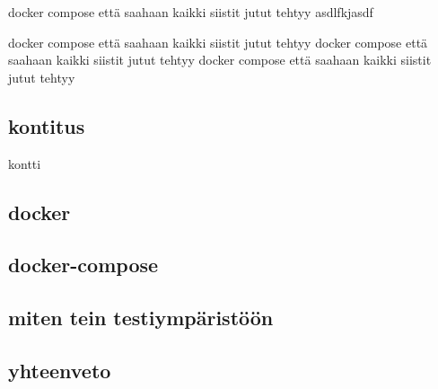 


docker compose että saahaan kaikki siistit jutut tehtyy
asdlfkjasdf

docker compose että saahaan kaikki siistit jutut tehtyy
docker compose että saahaan kaikki siistit jutut tehtyy
docker compose että saahaan kaikki siistit jutut tehtyy


\subsection*{kontitus}
kontti
\filename

\subsection*{docker}
\subsection*{docker-compose}
\subsection*{miten tein testiympäristöön}
\subsection*{yhteenveto}


